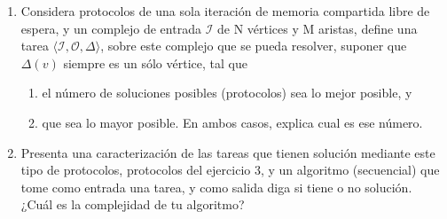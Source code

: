 \documentclass{article}
\begin{document}
\begin{enumerate}
\item{
    Considera protocolos de una sola iteración de memoria compartida libre de
    espera, y un complejo de entrada $\mathcal{I}$ de N vértices y M aristas,
    define una tarea $\langle \mathcal{I},\mathcal{O},\Delta \rangle$, sobre
    este complejo que se pueda resolver, suponer que $\Delta (v)$ siempre es
    un sólo vértice, tal que
    \begin{enumerate}
      \item{el número de soluciones posibles (protocolos) sea lo mejor posible,
          y}
        \item{que sea lo mayor posible. En ambos casos, explica cual es ese
            número.}
    \end{enumerate}
  }

\item{
    Presenta una caracterización de las tareas que tienen solución mediante este
    tipo de protocolos, protocolos del ejercicio 3, y un algoritmo (secuencial)
    que tome como entrada una tarea, y como salida diga si tiene o no solución.
    ¿Cuál es la complejidad de tu algoritmo?
  }
\end{enumerate}
\end{document}
